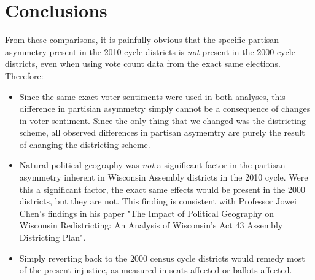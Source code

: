 \documentclass[preprint,12pt]{article}
\begin{document}
\section{Conclusions}
From these comparisons, it is painfully obvious that the specific partisan asymmetry present in the 2010 cycle districts is \emph{not} present in the 2000 cycle districts, even when using vote count data from the exact same elections.  Therefore:
\begin{itemize}
\item Since the same exact voter sentiments were used in both analyses, this difference in partisian asymmetry simply cannot be a consequence of changes in voter sentiment.  Since the only thing that we changed was the districting scheme, all observed differences in partisan asymemtry are purely the result of changing the districting scheme.
\item Natural political geography was \emph{not} a significant factor in the partisan asymmetry inherent in Wisconsin Assembly districts in the 2010 cycle.  Were this a significant factor, the exact same effects would be present in the 2000 districts, but they are not.  This finding is consistent with Professor Jowei Chen's findings in his paper "The Impact of Political Geography on Wisconsin Redistricting: An Analysis of Wisconsin's Act 43 Assembly Districting Plan".
\item Simply reverting back to the 2000 census cycle districts would remedy most of the present injustice, as measured in seats affected or ballots affected.
\end{itemize}



%


\clearpage
\end{document}
